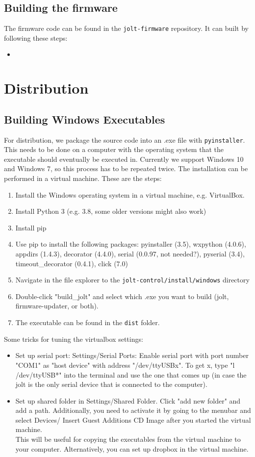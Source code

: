 \documentclass[]{article}
\begin{document}
\subsection{Building the firmware}
The firmware code can be found in the \texttt{jolt-firmware} repository. It can built by following these steps:
\begin{itemize}
	\item
\end{itemize}

\section{Distribution}
\subsection{Building Windows Executables}
For distribution, we package the source code into an .exe file with \texttt{pyinstaller}. This needs to be done on a computer with the operating system that the executable should eventually be executed in. Currently we support Windows 10 and Windows 7, so this process has to be repeated twice. The installation can be performed in a virtual machine. 
These are the steps:
\begin{enumerate}
	\item Install the Windows operating system in a virtual machine, e.g. VirtualBox.
	\item Install Python 3 (e.g. 3.8, some older versions might also work)
	\item Install pip
	\item Use pip to install the following packages: pyinstaller (3.5), wxpython (4.0.6), appdirs (1.4.3), decorator (4.4.0), serial (0.0.97, not needed?), pyserial (3.4), timeout\_decorator (0.4.1), click (7.0)
	\item Navigate in the file explorer to the \texttt{jolt-control/install/windows} directory
	\item Double-click "build\_jolt" and select which .exe you want to build (jolt, firmware-updater, or both).
	\item The executable can be found in the \texttt{dist} folder.
\end{enumerate}
Some tricks for tuning the virtualbox settings:
\begin{itemize}
	\item Set up serial port: Settings/Serial Ports: Enable serial port with port number "COM1" as "host device" with address "/dev/ttyUSBx". To get x, type "l /dev/ttyUSB*" into the terminal and use the one that comes up (in case the jolt is the only serial device that is connected to the computer).
	\item Set up shared folder in Settings/Shared Folder. Click "add new folder" and add a path. Additionally, you need to activate it by going to the menubar and select Devices/ Insert Guest Additions CD Image after you started the virtual machine.\\
	This will be useful for copying the executables from the virtual machine to your computer. Alternatively, you can set up dropbox in the virtual machine.
\end{itemize}
\end{document}
